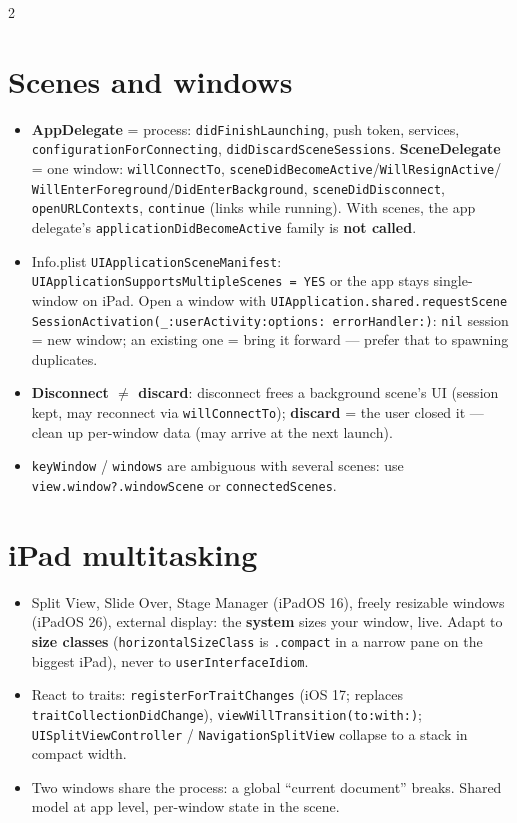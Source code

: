 \documentclass[8pt]{extarticle}
\begin{document}
\begin{multicols}{2}
\raggedright

\section{Scenes and windows}
\begin{itemize}
  \item \textbf{AppDelegate} = process: \texttt{didFinishLaunching}, push token,
        services, \texttt{configurationForConnecting}, \texttt{didDiscardSceneSessions}.
        \textbf{SceneDelegate} = one window: \texttt{willConnectTo},
        \texttt{sceneDidBecomeActive}/\texttt{WillResignActive}/\allowbreak
        \texttt{WillEnterForeground}/\allowbreak\texttt{DidEnterBackground},
        \texttt{sceneDid\allowbreak Disconnect}, \texttt{openURLContexts}, \texttt{continue}
        (links while running). With scenes, the app delegate's
        \texttt{applicationDidBecomeActive} family is \textbf{not called}.
  \item Info.plist \texttt{UIApplicationSceneManifest}:
        \texttt{UIApplication\allowbreak SupportsMultipleScenes = YES} or the app stays
        single-window on iPad. Open a window with
        \texttt{UIApplication.shared.\allowbreak requestScene\allowbreak
        SessionActivation(\_:userActivity:\allowbreak options:\allowbreak
        errorHandler:)}: \texttt{nil} session = new window; an existing one = bring
        it forward — prefer that to spawning duplicates.
  \item \textbf{Disconnect $\neq$ discard}: disconnect frees a background scene's UI
        (session kept, may reconnect via \texttt{willConnectTo});
        \textbf{discard} = the user closed it — clean up per-window data (may
        arrive at the next launch).
  \item \texttt{keyWindow} / \texttt{windows} are ambiguous with several scenes: use
        \texttt{view.window?.windowScene} or \texttt{connectedScenes}.
\end{itemize}

\section{iPad multitasking}
\begin{itemize}
  \item Split View, Slide Over, Stage Manager (iPadOS 16), freely resizable windows
        (iPadOS 26), external display: the
        \textbf{system} sizes your window, live. Adapt to \textbf{size classes}
        (\texttt{horizontalSizeClass} is \texttt{.compact} in a narrow pane on the
        biggest iPad), never to \texttt{userInterfaceIdiom}.
  \item React to traits: \texttt{registerForTraitChanges} (iOS 17; replaces
        \texttt{traitCollectionDidChange}), \texttt{viewWillTransition(to:with:)};
        \texttt{UISplitViewController} / \texttt{NavigationSplitView} collapse to a
        stack in compact width.
  \item Two windows share the process: a global ``current document'' breaks. Shared
        model at app level, per-window state in the scene.
\end{itemize}


\end{multicols}
\end{document}

